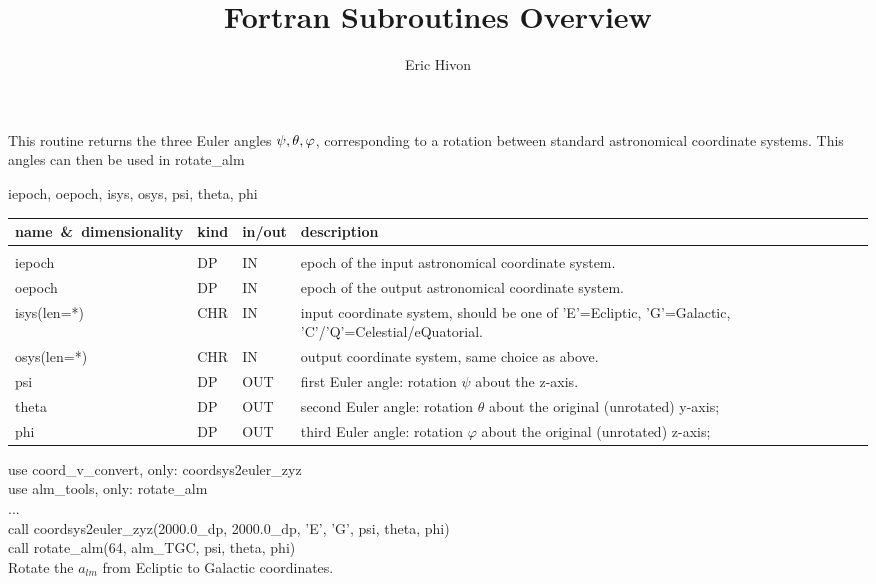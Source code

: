 \sloppy


\title{\healpix Fortran Subroutines Overview}
 \section[coordsys2euler\_zyz]{ }
\label{sub:coordsys2euler_zyz}
\author{Eric Hivon}

\begin{facility}
{This routine returns the three Euler angles $\psi, \theta, \varphi
$, corresponding to a rotation between standard astronomical
coordinate systems. This angles can then be used in rotate\_alm}
{\modCoordVConvert}
\end{facility}

\begin{f90format}
{iepoch, oepoch, isys, osys, psi, theta, phi}
\end{f90format}

\begin{arguments}
{
\begin{tabular}{p{0.26\hsize} p{0.05\hsize} p{0.09\hsize} p{0.50\hsize}} \hline  
\textbf{name~\&~dimensionality} & \textbf{kind} & \textbf{in/out} & \textbf{description} \\ \hline
                   &   &   &                           \\ %
iepoch & DP & IN & epoch of the input astronomical coordinate system.\\
oepoch & DP & IN & epoch of the output astronomical coordinate system.\\
isys(len=*) & CHR & IN & input coordinate system, should be one of 'E'=Ecliptic, 'G'=Galactic, 'C'/'Q'=Celestial/eQuatorial.\\
osys(len=*) & CHR & IN & output coordinate system, same choice as above.\\
psi	& DP & OUT & first Euler angle: rotation $\psi$ about the z-axis. \\
theta	& DP & OUT & second Euler angle: rotation $\theta$ about the original
(unrotated) y-axis; \\
phi	& DP & OUT & third Euler angle: rotation $\varphi$ about the original (unrotated) z-axis;
\end{tabular}
}
\end{arguments}

\begin{example}
{
use coord\_v\_convert, only: coordsys2euler\_zyz \\
use alm\_tools, only: rotate\_alm \\
...\\
call coordsys2euler\_zyz(2000.0\_dp, 2000.0\_dp, 'E', 'G', psi, theta, phi) \\
call rotate\_alm(64, alm\_TGC, psi, theta, phi)  \\
}
{
Rotate the $a_{lm}$ from Ecliptic to Galactic coordinates.
}
\end{example}

